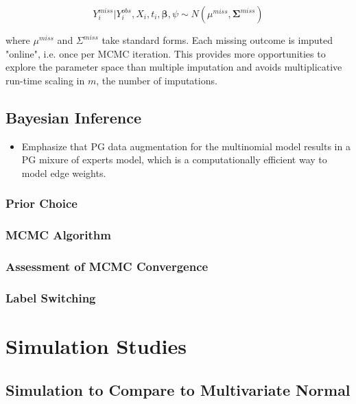 \documentclass[useAMS,referee]{biom}
\begin{document}
$$Y_i^{miss}|Y_i^{obs},X_i,t_i,\boldsymbol\beta,\psi \sim N(\mu^{miss},\boldsymbol\Sigma^{miss})$$

where $\mu^{miss}$ and $\Sigma^{miss}$ take standard forms. Each missing outcome is imputed "online", i.e. once per MCMC iteration. This provides more opportunities to explore the parameter space than multiple imputation and avoids multiplicative run-time scaling in $m$, the number of imputations.

\subsection{Bayesian Inference}

\begin{itemize}

\item Emphasize that PG data augmentation for the multinomial model results in a PG mixure of experts model, which is a computationally efficient way to model edge weights. 

\end{itemize}

\subsubsection{Prior Choice}

\subsubsection{MCMC Algorithm}

\subsubsection{Assessment of MCMC Convergence}

\subsubsection{Label Switching}


\newpage

\section{Simulation Studies}
\label{s:sim}

\subsection{Simulation to Compare to Multivariate Normal}
\end{document}
